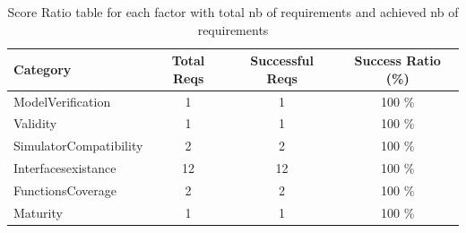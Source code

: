 \documentclass{article}
\begin{document}
						\begin{table}
						\centering
						\caption{Score Ratio table for each factor with total nb of requirements and achieved nb of requirements}
						\begin{tabular}{|l|c|c|c|}
						\hline
						Category & Total Reqs & Successful Reqs & Success Ratio (\%) \\
						\hline

							    ModelVerification & 1 & 1 & 100 \% \\
							 

							    Validity & 1 & 1 & 100 \% \\
							 

							    SimulatorCompatibility & 2 & 2 & 100 \% \\
							 

							    Interfacesexistance & 12 & 12 & 100 \% \\
							 

							    FunctionsCoverage & 2 & 2 & 100 \% \\
							 

							    Maturity & 1 & 1 & 100 \% \\
							 
					
						
						\hline
						\end{tabular}
						\end{table}




										
								

			
\end{document}
